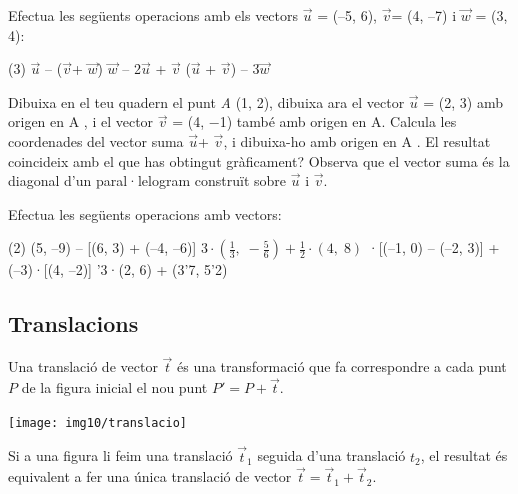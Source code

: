 \begin{mylist}


\exer[1]  Efectua les següents operacions amb els vectors $\vec u$\textit{ }= (--5, 6), $\vec v$= (4, --7) i $\vec w$ = (3, 4):

\begin{tasks}(3)
	$\vec u$ -- ($\vec v$+ $\vec w$)   
	$\vec w$ -- 2$\vec u$ + $\vec v$   
	($\vec u$ + $\vec v$) -- 3$\vec w$
\end{tasks}
\answers[cols=1]{[$(-17,15)$, $(23,-7)$, $(-11,-14)$]}

\exer  Dibuixa en el teu quadern el punt \textit{A} (1, 2), dibuixa ara el vector $\vec u$ = (2, 3) amb origen en A , i el vector $\vec v$ = (4, $-$1) també amb origen en A. Calcula les coordenades del vector suma $\vec u$+ $\vec v$, i dibuixa-ho amb origen en A . El resultat coincideix amb el que has obtingut gràficament? Observa que el vector suma és la diagonal d'un paral·lelogram construït sobre $\vec u$ i $\vec v$.


\exer  Efectua les següents operacions amb vectors:

\begin{tasks}(2)
	\task   (5, --9) -- [(6, 3) + (--4, --6)]   
	\task    $3\cdot \left(\frac{1}{3} ,\; -\frac{5}{6} \right)+\frac{1}{2} \cdot (4,\; 8)$      
	·[(--1, 0) -- (--2, 3)] + (--3)·[(4, --2)]   
	'3·(2, 6) + (3'7, 5'2)
\end{tasks}

 \answers{[$(3,-6)$, $(3,\frac{3}{2})$, $(65,-99)$, $(22.3,61)$]}

\end{mylist}

\subsection{Translacions}

\begin{theorybox}
	
	 
 	\begin{minipage}{0.5\textwidth}
		Una translació de vector $\vec t$ és una transformació que fa correspondre a cada punt $P$ de la figura inicial el nou punt $P'=P+\vec t$.
	\end{minipage}
	\begin{minipage}{0.5\textwidth}
		\centering
	 
		\texttt{[image: img10/translacio]}
	\end{minipage}
	
	Si a una figura li feim una translació $\vec t_1$ seguida d'una translació $t_2$, el resultat és equivalent a fer una única translació de vector $\vec t = \vec t_1 + \vec t_2$.
	
	
\end{theorybox}

